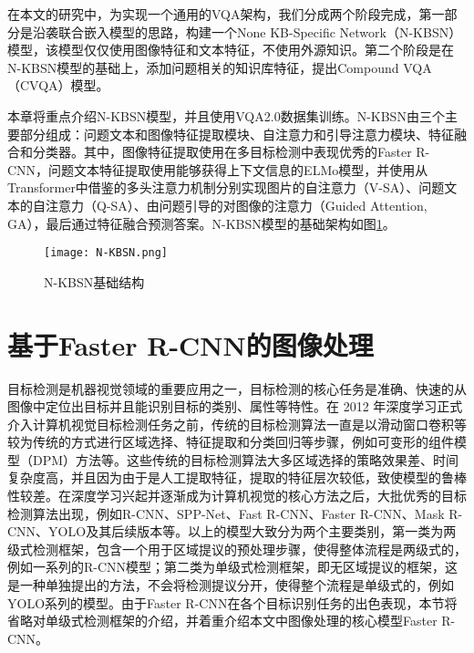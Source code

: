 在本文的研究中，为实现一个通用的VQA架构，我们分成两个阶段完成，第一部分是沿袭联合嵌入模型的思路，构建一个None KB-Specific Network（N-KBSN）模型，该模型仅仅使用图像特征和文本特征，不使用外源知识。第二个阶段是在N-KBSN模型的基础上，添加问题相关的知识库特征，提出Compound VQA（CVQA）模型。

本章将重点介绍N-KBSN模型，并且使用VQA2.0数据集训练。N-KBSN由三个主要部分组成：问题文本和图像特征提取模块、自注意力和引导注意力模块、特征融合和分类器。其中，图像特征提取使用在多目标检测中表现优秀的Faster R-CNN，问题文本特征提取使用能够获得上下文信息的ELMo模型，并使用从Transformer中借鉴的多头注意力机制分别实现图片的自注意力（V-SA）、问题文本的自注意力（Q-SA）、由问题引导的对图像的注意力（Guided Attention, GA），最后通过特征融合预测答案。N-KBSN模型的基础架构如图\ref{N-KBSN}。
\begin{figure}[H]
	\texttt{[image: N-KBSN.png]}
	\caption{N-KBSN基础结构}
	\label{N-KBSN}
\end{figure}

\section{基于Faster R-CNN的图像处理}
目标检测是机器视觉领域的重要应用之一，目标检测的核心任务是准确、快速的从图像中定位出目标并且能识别目标的类别、属性等特性。在 2012 年深度学习正式介入计算机视觉目标检测任务之前，传统的目标检测算法一直是以滑动窗口卷积等较为传统的方式进行区域选择、特征提取和分类回归等步骤，例如可变形的组件模型（DPM）方法等。这些传统的目标检测算法大多区域选择的策略效果差、时间复杂度高，并且因为由于是人工提取特征，提取的特征层次较低，致使模型的鲁棒性较差。在深度学习兴起并逐渐成为计算机视觉的核心方法之后，大批优秀的目标检测算法出现，例如R-CNN、SPP-Net、Fast R-CNN、Faster R-CNN、Mask R-CNN、YOLO及其后续版本等。以上的模型大致分为两个主要类别，第一类为两级式检测框架，包含一个用于区域提议的预处理步骤，使得整体流程是两级式的，例如一系列的R-CNN模型；第二类为单级式检测框架，即无区域提议的框架，这是一种单独提出的方法，不会将检测提议分开，使得整个流程是单级式的，例如YOLO系列的模型。由于Faster R-CNN在各个目标识别任务的出色表现，本节将省略对单级式检测框架的介绍，并着重介绍本文中图像处理的核心模型Faster R-CNN。

